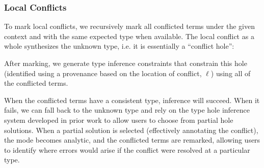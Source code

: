 \subsubsection{Local Conflicts}
To mark local conflicts, we recursively mark all conflicted terms under the given context and with the same expected type when available. The local conflict as a whole synthesizes the unknown type, i.e. it is essentially a ``conflict hole'':
\begin{mathpar}

\end{mathpar}

After marking, we generate type inference constraints that constrain this hole (identified using a provenance based on the location of conflict, $\ell$) using all of the conflicted terms.
\begin{mathpar}

\end{mathpar}

 When the conflicted terms have a consistent type, inference will succeed. When it fails, we can fall back to the unknown type and rely on the type hole inference system developed in prior work to allow users to choose from partial hole solutions. When a partial solution is selected (effectively annotating the conflict), the mode becomes analytic, and the conflicted terms are remarked, allowing users to identify where errors would arise if the conflict were resolved at a particular type.


